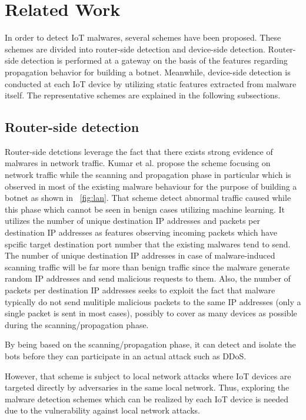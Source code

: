 \chapter{Related Work}\label{sec:related_work} 
In order to detect IoT malwares, several schemes have been proposed. 
These schemes are divided into router-side detection and device-side detection.
Router-side detection is performed at a gateway on the basis of the features regarding propagation behavior for building a botnet.
Meanwhile, device-side detection is conducted at each IoT device by utilizing static features extracted from malware itself.
The representative schemes are explained in the following subsections.

\section{Router-side detection}
Router-side detctions leverage the fact that there exists strong evidence of malwares in network traffic.
Kumar et al. \cite{router} propose the scheme focusing on network traffic while the scanning and propagation phase in particular which is observed in most of the existing malware behaviour for the purpose of building a botnet as shown in \figurename~\ref{fig:lan}. 
That scheme detect abnormal traffic caused while this phase which cannot be seen in benign cases utilizing machine learning.
It utilizes the number of unique destination IP addresses and packets per destination IP addresses as features observing incoming packets which have spcific target destination port number that the existing malwares tend to send.
The number of unique destination IP addresses in case of malware-induced scanning traffic will be far more than benign traffic since the malware generate random IP addresses and send malicious requests to them.
Also, the number of packets per destination IP addresses seeks to exploit the fact that malware typically do not send mulitiple malicious packets to the same IP addresses (only a single packet is sent in most cases), possibly to cover as many devices as possible during the scanning/propagation phase.

By being based on the scanning/propagation phase, it can detect and isolate the bots before they can participate in an actual attack such as DDoS.

However, that scheme is subject to local network attacks where IoT devices are targeted directly by adversaries in the same local network.
Thus, exploring the malware detection schemes which can be realized by each IoT device is needed due to the vulnerability against local network attacks.

